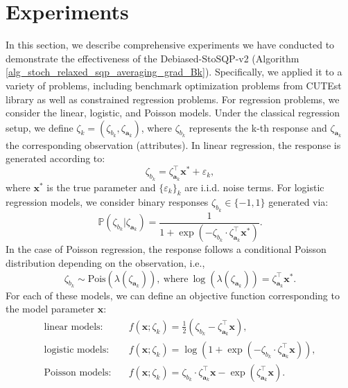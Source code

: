 \documentclass[aos]{imsart}
\numberwithin{equation}{section}
\theoremstyle{plain}
\begin{document}
\section{Experiments}
\label{sec:experiments}

In this section, we describe comprehensive experiments we have conducted to demonstrate the effectiveness of the Debiased-StoSQP-v2 (Algorithm \ref{alg_stoch_relaxed_sqp_averaging_grad_Bk}). 
Specifically, we applied it to a variety of problems, including benchmark optimization problems from CUTEst library \cite{gould2015cutest, fowkes2022pycutest} as well as constrained regression problems. 
For regression problems, we consider the linear, logistic, and Poisson models.
Under the classical regression setup, we define $\zeta_k = \left(\zeta_{b_k}, \zeta_{\bm{a}_k} \right)$, where $\zeta_{b_k}$ represents the k-th response and $\zeta_{\bm{a}_k}$ the corresponding observation (attributes).
In linear regression, the response is generated according to:
\begin{equation*}
    \zeta_{b_k} = \zeta_{\bm{a}_k}^{\top} \bm{x}^{*} + \varepsilon_k,
\end{equation*}
where $\bm{x}^{*}$ is the true parameter and $\{\varepsilon_k\}_{k}$ are i.i.d. noise terms. For logistic regression models, we consider binary responses $\zeta_{b_k} \in \{-1,1\}$ generated via:
\begin{equation*}
    \mathbb{P}\left(\zeta_{b_k}| \zeta_{\bm{a}_k}\right) = \frac{1}{1 + \exp \left( -\zeta_{b_k} \cdot \zeta_{\bm{a}_k}^{\top} \bm{x}^{*} \right)}.
\end{equation*}
In the case of Poisson regression, the response follows a conditional Poisson distribution depending on the observation, i.e., 
\begin{equation*}
    \zeta_{b_k} \sim \text{Pois}\left( \lambda(\zeta_{\bm{a}_k})\right), ~\text{where}~\log(\lambda(\zeta_{\bm{a}_k})) =  \zeta_{\bm{a}_k}^{\top} \bm{x}^{*}.
\end{equation*}
For each of these models, we can define an objective function corresponding to the model parameter $\bm{x}$:
\begin{equation*}
    \begin{split}
        \text{linear models:} & \hspace{1em} f(\bm{x};\zeta_k) = \frac{1}{2} \left(\zeta_{b_k} - \zeta_{\bm{a}_k}^{\top} \bm{x} \right),\\
        \text{logistic models:} & \hspace{1em} f(\bm{x};\zeta_k) = \log\left(1 + \exp \left( -\zeta_{b_k} \cdot \zeta_{\bm{a}_k}^{\top} \bm{x}  \right) \right),\\
        \text{Poisson models:} & \hspace{1em} f(\bm{x};\zeta_k) = \zeta_{b_k} \cdot \zeta_{\bm{a}_k}^{\top} \bm{x} - \exp \left(\zeta_{\bm{a}_k}^{\top} \bm{x} \right).
    \end{split}
\end{equation*}
\end{document}
